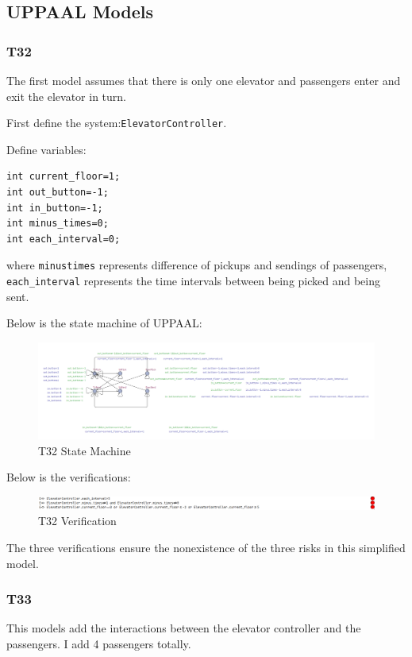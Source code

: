 \documentclass{article}
\begin{document}
\subsection*{UPPAAL Models}
\subsubsection*{T32}
The first model assumes that there is only one elevator and passengers enter and exit the elevator in turn.

First define the system:\lstinline!ElevatorController!.

Define variables:
\begin{lstlisting}
int current_floor=1;
int out_button=-1;
int in_button=-1;
int minus_times=0;
int each_interval=0;
\end{lstlisting}
where \lstinline!minustimes! represents difference of pickups and sendings of passengers, \lstinline!each_interval! represents the time intervals between being picked and being sent.

Below is the state machine of UPPAAL:

\begin{figure}[htbp]
    \centering
    \includegraphics[width=\textwidth]{img/uppaal_state_machine_1.png}
    \caption{T32 State Machine}
\end{figure}

Below is the verifications:

\begin{figure}[htbp]
    \centering
    \includegraphics[width=\textwidth]{img/uppaal_verification_1.png}
    \caption{T32 Verification}
\end{figure}

The three verifications ensure the nonexistence of the three risks in this simplified model.

\subsubsection*{T33}
This models add the interactions between the elevator controller and the passengers. I add 4 passengers totally.
\end{document}
